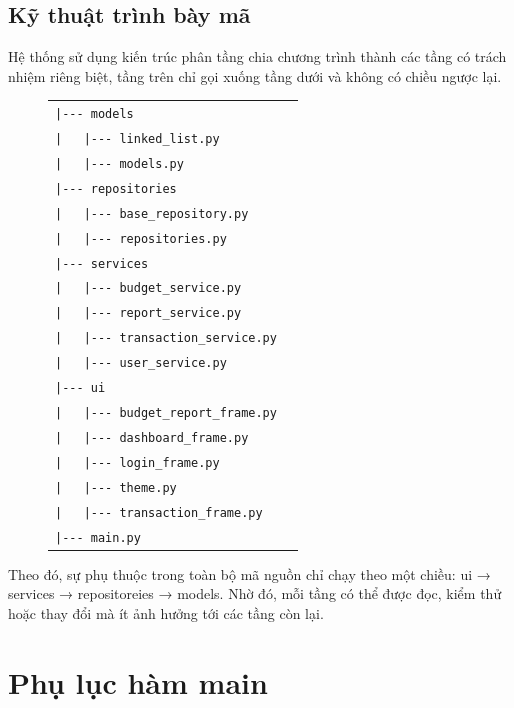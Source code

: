 \documentclass[12pt,letterpaper]{article}
\begin{document}
\subsection{Kỹ thuật trình bày mã}
Hệ thống sử dụng kiến trúc phân tầng chia chương trình thành các tầng có trách nhiệm riêng biệt, tầng trên chỉ gọi xuống tầng dưới và không có chiều ngược lại.
\begin{figure}[H]
    \centering
    \renewcommand{\arraystretch}{1.3} 
    \begin{tabular}{@{} l l @{}} 
    \texttt{|-\/-\/- models} & \\
    \texttt{| \ \ |-\/-\/- linked\_list.py} & \\
    \texttt{| \ \ |-\/-\/- models.py} & \\
    \texttt{|-\/-\/- repositories} &  \\
    \texttt{| \ \ |-\/-\/- base\_repository.py} & \\
    \texttt{| \ \ |-\/-\/- repositories.py} & \\
    \texttt{|-\/-\/- services} &  \\
    \texttt{| \ \ |-\/-\/- budget\_service.py} & \\
    \texttt{| \ \ |-\/-\/- report\_service.py} & \\
    \texttt{| \ \ |-\/-\/- transaction\_service.py} & \\
    \texttt{| \ \ |-\/-\/- user\_service.py} & \\
    \texttt{|-\/-\/- ui} &  \\
    \texttt{| \ \ |-\/-\/- budget\_report\_frame.py} & \\
    \texttt{| \ \ |-\/-\/- dashboard\_frame.py} & \\
    \texttt{| \ \ |-\/-\/- login\_frame.py} & \\
    \texttt{| \ \ |-\/-\/- theme.py} & \\
    \texttt{| \ \ |-\/-\/- transaction\_frame.py} & \\
    \texttt{|-\/-\/- main.py} &  \\
    \end{tabular}
\end{figure}
Theo đó, sự phụ thuộc trong toàn bộ mã nguồn chỉ chạy theo một chiều: ui → services → repositoreies → models. Nhờ đó, mỗi tầng có thể được đọc, kiểm thử hoặc thay đổi mà ít ảnh hưởng tới các tầng còn lại.

\newpage
\section{Phụ lục hàm main}
\end{document}
